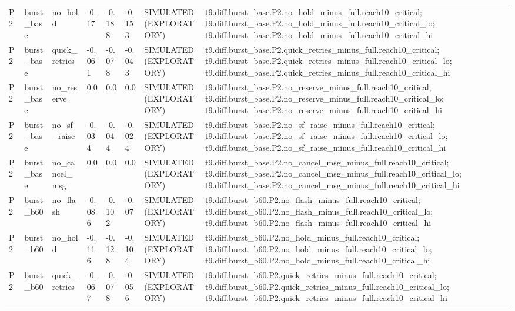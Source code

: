 \begin{table}[t]
\begin{tabular}{llllllll}
P2 & burst\_base & no\_hold & -0.17 & -0.188 & -0.153 & SIMULATED (EXPLORATORY) & t9.diff.burst\_base.P2.no\_hold\_minus\_full.reach10\_critical; t9.diff.burst\_base.P2.no\_hold\_minus\_full.reach10\_critical\_lo; t9.diff.burst\_base.P2.no\_hold\_minus\_full.reach10\_critical\_hi \\
P2 & burst\_base & quick\_retries & -0.061 & -0.078 & -0.043 & SIMULATED (EXPLORATORY) & t9.diff.burst\_base.P2.quick\_retries\_minus\_full.reach10\_critical; t9.diff.burst\_base.P2.quick\_retries\_minus\_full.reach10\_critical\_lo; t9.diff.burst\_base.P2.quick\_retries\_minus\_full.reach10\_critical\_hi \\
P2 & burst\_base & no\_reserve & 0.0 & 0.0 & 0.0 & SIMULATED (EXPLORATORY) & t9.diff.burst\_base.P2.no\_reserve\_minus\_full.reach10\_critical; t9.diff.burst\_base.P2.no\_reserve\_minus\_full.reach10\_critical\_lo; t9.diff.burst\_base.P2.no\_reserve\_minus\_full.reach10\_critical\_hi \\
P2 & burst\_base & no\_sf\_raise & -0.034 & -0.044 & -0.024 & SIMULATED (EXPLORATORY) & t9.diff.burst\_base.P2.no\_sf\_raise\_minus\_full.reach10\_critical; t9.diff.burst\_base.P2.no\_sf\_raise\_minus\_full.reach10\_critical\_lo; t9.diff.burst\_base.P2.no\_sf\_raise\_minus\_full.reach10\_critical\_hi \\
P2 & burst\_base & no\_cancel\_msg & 0.0 & 0.0 & 0.0 & SIMULATED (EXPLORATORY) & t9.diff.burst\_base.P2.no\_cancel\_msg\_minus\_full.reach10\_critical; t9.diff.burst\_base.P2.no\_cancel\_msg\_minus\_full.reach10\_critical\_lo; t9.diff.burst\_base.P2.no\_cancel\_msg\_minus\_full.reach10\_critical\_hi \\
P2 & burst\_b60 & no\_flash & -0.086 & -0.102 & -0.07 & SIMULATED (EXPLORATORY) & t9.diff.burst\_b60.P2.no\_flash\_minus\_full.reach10\_critical; t9.diff.burst\_b60.P2.no\_flash\_minus\_full.reach10\_critical\_lo; t9.diff.burst\_b60.P2.no\_flash\_minus\_full.reach10\_critical\_hi \\
P2 & burst\_b60 & no\_hold & -0.116 & -0.128 & -0.104 & SIMULATED (EXPLORATORY) & t9.diff.burst\_b60.P2.no\_hold\_minus\_full.reach10\_critical; t9.diff.burst\_b60.P2.no\_hold\_minus\_full.reach10\_critical\_lo; t9.diff.burst\_b60.P2.no\_hold\_minus\_full.reach10\_critical\_hi \\
P2 & burst\_b60 & quick\_retries & -0.067 & -0.078 & -0.056 & SIMULATED (EXPLORATORY) & t9.diff.burst\_b60.P2.quick\_retries\_minus\_full.reach10\_critical; t9.diff.burst\_b60.P2.quick\_retries\_minus\_full.reach10\_critical\_lo; t9.diff.burst\_b60.P2.quick\_retries\_minus\_full.reach10\_critical\_hi \\

\end{tabular}
\end{table}
